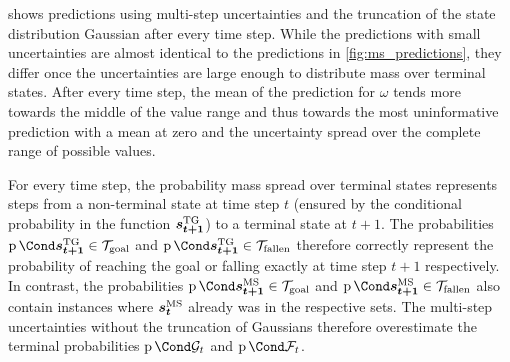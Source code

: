  shows predictions using multi-step uncertainties and the truncation of the state distribution Gaussian after every time step.
While the predictions with small uncertainties are almost identical to the predictions in \cref{fig:ms_predictions}, they differ once the uncertainties are large enough to distribute mass over terminal states.
After every time step, the mean of the prediction for $\omega$ tends more towards the middle of the value range and thus towards the most uninformative prediction with a mean at zero and the uncertainty spread over the complete range of possible values.

For every time step, the probability mass spread over terminal states represents steps from a non-terminal state at time step $t$ (ensured by the conditional probability in the function $\bm{s_{t+1}}^{\text{TG}}$) to a terminal state at $t+1$.
The probabilities $\Prob{\tg{\rv{s_{t+1}}} \in \Goal}$ and $\Prob{\tg{\rv{s_{t+1}}} \in \Fallen}$ therefore correctly represent the probability of reaching the goal or falling exactly at time step $t+1$ respectively.
In contrast, the probabilities $\Prob{\ms{\rv{s_{t+1}}} \in \Goal}$ and $\Prob{\ms{\rv{s_{t+1}}} \in \Fallen}$ also contain instances where $\bm{s_t}^{\text{MS}}$ already was in the respective sets.
The multi-step uncertainties without the truncation of Gaussians therefore overestimate the terminal probabilities $\Prob{\PGoal_t}$ and $\Prob{\PFallen_t}$.

